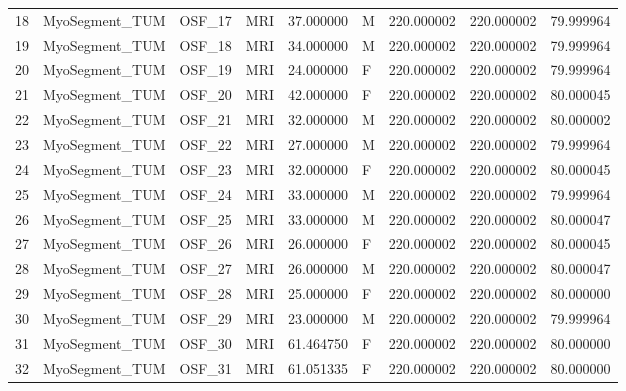 \begin{tabular}{llllrlrrr}
18     &  MyoSegment\_TUM &       OSF\_17 &                MRI &  37.000000 &        M &       220.000002 &    220.000002 &   79.999964 \\
19     &  MyoSegment\_TUM &       OSF\_18 &                MRI &  34.000000 &        M &       220.000002 &    220.000002 &   79.999964 \\
20     &  MyoSegment\_TUM &       OSF\_19 &                MRI &  24.000000 &        F &       220.000002 &    220.000002 &   79.999964 \\
21     &  MyoSegment\_TUM &       OSF\_20 &                MRI &  42.000000 &        F &       220.000002 &    220.000002 &   80.000045 \\
22     &  MyoSegment\_TUM &       OSF\_21 &                MRI &  32.000000 &        M &       220.000002 &    220.000002 &   80.000002 \\
23     &  MyoSegment\_TUM &       OSF\_22 &                MRI &  27.000000 &        M &       220.000002 &    220.000002 &   79.999964 \\
24     &  MyoSegment\_TUM &       OSF\_23 &                MRI &  32.000000 &        F &       220.000002 &    220.000002 &   80.000045 \\
25     &  MyoSegment\_TUM &       OSF\_24 &                MRI &  33.000000 &        M &       220.000002 &    220.000002 &   79.999964 \\
26     &  MyoSegment\_TUM &       OSF\_25 &                MRI &  33.000000 &        M &       220.000002 &    220.000002 &   80.000047 \\
27     &  MyoSegment\_TUM &       OSF\_26 &                MRI &  26.000000 &        F &       220.000002 &    220.000002 &   80.000045 \\
28     &  MyoSegment\_TUM &       OSF\_27 &                MRI &  26.000000 &        M &       220.000002 &    220.000002 &   80.000047 \\
29     &  MyoSegment\_TUM &       OSF\_28 &                MRI &  25.000000 &        F &       220.000002 &    220.000002 &   80.000000 \\
30     &  MyoSegment\_TUM &       OSF\_29 &                MRI &  23.000000 &        M &       220.000002 &    220.000002 &   79.999964 \\
31     &  MyoSegment\_TUM &       OSF\_30 &                MRI &  61.464750 &        F &       220.000002 &    220.000002 &   80.000000 \\
32     &  MyoSegment\_TUM &       OSF\_31 &                MRI &  61.051335 &        F &       220.000002 &    220.000002 &   80.000000 \\

\end{tabular}
